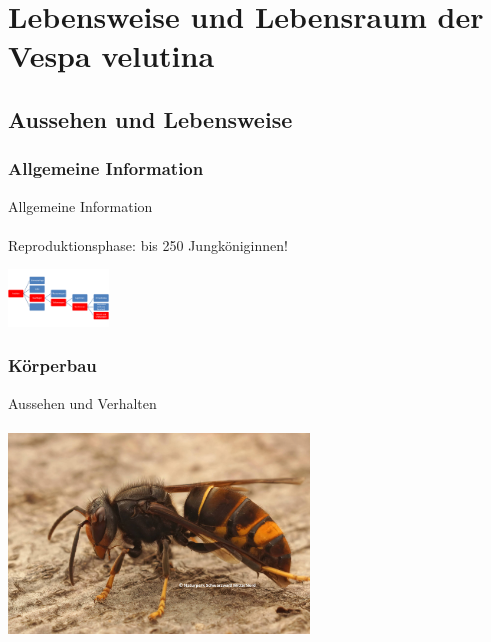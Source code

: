 \documentclass[aspectratio=169]{beamer}
\begin{document}
\section{Lebensweise und Lebensraum der Vespa velutina}

\subsection{Aussehen und Lebensweise}


\subsubsection[Allgemeine Information]{Allgemeine Information}

\begin{frame}{Allgemeine Information}
	\framesubtitle{} 

\begin{examples}{Reproduktionsphase:  }{bis 250 Jungköniginnen!}
		\begin{center}	
			\includegraphics[width=0.2\textwidth]{figures/Insekten-31.png}
		\end{center}
		\end{examples}

	\end{frame}

\subsubsection[Körperbau]{Körperbau}

\begin{frame}{Aussehen und Verhalten}
	\framesubtitle{} 
	\begin{center}	
		\includegraphics[width=0.6\textwidth]{figures/asiatische_hornisse3.jpg}
	\end{center}
\end{frame}
\end{document}
